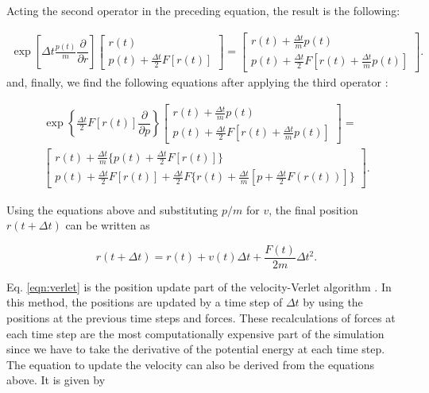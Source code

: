 Acting the second operator in the preceding equation, the result is the following:

\begin{equation}
\begin{aligned}
\exp \left[ \Delta t \frac{p(t)}{m}\dfrac{\partial }{\partial r} \right]
\left[ \begin{array}{c} r(t) \\ p(t) + \frac{\Delta t}{2} F[r(t)] \end{array} \right] = 
\left[ \begin{array}{c} r(t) + \frac{\Delta t}{m}p(t) \\ p(t) + \frac{\Delta t}{2} F[r(t) + \frac{\Delta t}{m}p(t) ] \end{array} \right] .
\end{aligned}
\end{equation}
and, finally, we find the following equations after applying the third operator :

\begin{equation}
\begin{aligned}
\exp \left \lbrace \frac{\Delta t}{2} F[r(t)] \dfrac{\partial}{\partial p} \right \rbrace
\left[ \begin{array}{c} r(t) + \frac{\Delta t}{m}p(t) \\ p(t) + \frac{\Delta t}{2} F[r(t) + \frac{\Delta t}{m}p(t) ] \end{array} \right]= \\ 
\left[ \begin{array}{c} r(t) + \frac{\Delta t}{m} \lbrace p(t)+\frac{\Delta t}{2} F[r(t)]\rbrace \\ p(t) + \frac{\Delta t}{2} F[r(t)] + \frac{\Delta t}{2} F\{r(t)+ \frac{\Delta t}{m} [p + \frac{\Delta t}{2}F(r(t))]\}\end{array} \right] .
\end{aligned}
\end{equation}

Using the equations above and substituting $p/m$ for $v$, the final position $r(t+\Delta t)$ can be written as

\begin{equation}
r(t+ \Delta t) = r(t) +v(t) \Delta t + \frac{F(t)}{2m} \Delta t^{2}.
\label{eqn:verlet}
\end{equation}

Eq.  \ref{eqn:verlet} is the position update part of the velocity-Verlet algorithm \cite{verlet}. In this method, the positions are updated by a time step of $\Delta t$ by using the positions at the previous time steps and forces. These recalculations of forces at each time step are the most computationally expensive part of the simulation since we have to take the derivative of the potential energy at each time step. The equation to update the velocity can also be derived from the equations above. It is given by

